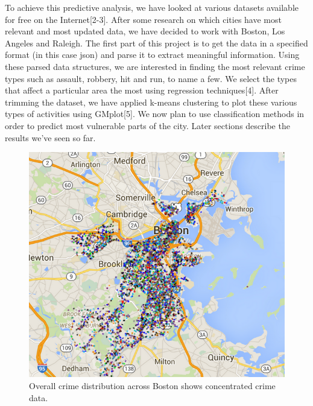 \documentclass[journal, a4paper]{IEEEtran}
\begin{document}
   To achieve this predictive analysis, we have looked at various datasets available for free on the Internet[2-3]. After some research on which cities have most relevant and most updated data, we have decided to work with Boston, Los Angeles and Raleigh. The first part of this project is to get the data in a specified format (in this case json) and parse it to extract meaningful information. Using these parsed data structures, we are interested in finding the most relevant crime types such as assault, robbery, hit and run, to name a few. We select the types that affect a particular area the most using regression techniques[4]. After trimming the dataset, we have applied k-means clustering to plot these various types of activities using GMplot[5]. We now plan to use classification methods in order to predict most vulnerable parts of the city. Later sections describe the results we've seen so far.
    \begin{figure}[!hbt]
        \begin{center}
        \includegraphics[width=\columnwidth]{fig1.png}
        \caption{Overall crime distribution across Boston shows concentrated crime data.}
        \label{fig:tf_plot}
        \end{center}
    \end{figure}
\end{document}
